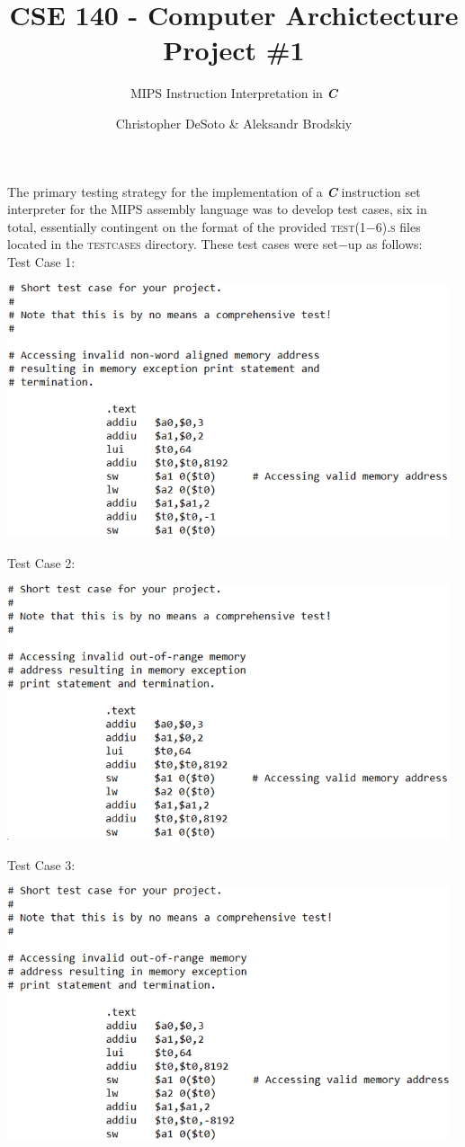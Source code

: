 \documentclass[12pt]{article}
\title{CSE 140 - Computer Archictecture \\ Project \#1}
\subtitle{\textsc{MIPS} Instruction Interpretation in \textbf{\textit{C}}}
\author{Christopher DeSoto \& Aleksandr Brodskiy}
\begin{document}
\maketitle
{\setlength{\parindent}{0cm}
The primary testing strategy for the implementation of a \textbf{\textit{C}} instruction set interpreter for the \textsc{MIPS} assembly language was to develop test cases, six in total, essentially contingent on the format of the provided \textsc{test}(1$-$6).\textsc{s} files located in the \textsc{test}\underline{\hspace{.3cm}}\textsc{cases} directory. These test cases were set$-$up as follows:\\
Test Case 1:
\begin{center}
\includegraphics[width=130mm]{test_case1.png}
\end{center}
Test Case 2:
\begin{center}
\includegraphics[width=130mm]{test_case2.png}
\end{center}
Test Case 3:
\begin{center}
\includegraphics[width=130mm]{test_case3.png}

\end{center}}
\end{document}

